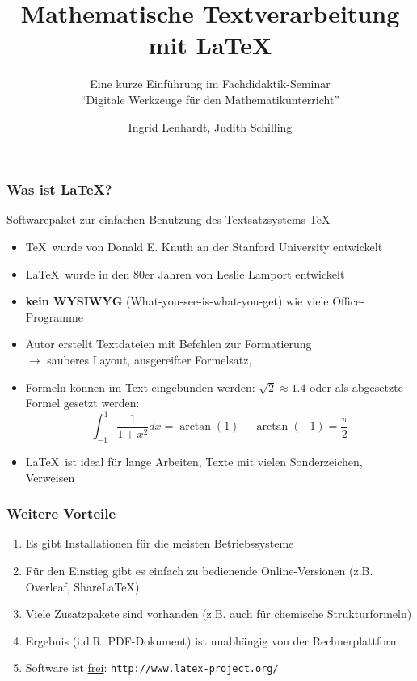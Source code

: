 \documentclass{beamer}
\title{Mathematische Textverarbeitung mit \LaTeX}
\subtitle{Eine kurze Einführung im Fachdidaktik-Seminar \\ ``Digitale Werkzeuge für den Mathematikunterricht''}
\author{Ingrid Lenhardt, Judith Schilling}
\begin{document}
 
\frame{\titlepage}

%
\begin{frame}
\frametitle{Was ist \LaTeX?}  %

Softwarepaket zur einfachen Benutzung des Textsatzsystems \TeX 
\begin{itemize} %
 \item \TeX \ wurde von Donald E. Knuth an der Stanford University entwickelt
 \item \LaTeX \ wurde in den 80er Jahren von Leslie Lamport entwickelt
 \item \textbf{kein WYSIWYG} %
       (What-you-see-is-what-you-get) wie viele Office-Programme
 \item Autor erstellt Textdateien mit Befehlen zur Formatierung \\ %
       $ \rightarrow $ %
       sauberes Layout, ausgereifter Formelsatz, 
 \item Formeln können im Text eingebunden werden: $\sqrt{2} \approx 1.4$ 
       oder als abgesetzte Formel gesetzt werden: 
       \[ 
          \int_{-1}^1 \frac{1}{1+x^2} dx = \arctan(1) -\arctan (-1) = \frac{\pi}{2}
       \] 
 \item \LaTeX \ ist ideal für lange Arbeiten, Texte mit vielen Sonderzeichen, Verweisen
\end{itemize}
\end{frame}

%
\begin{frame}
\frametitle{Weitere Vorteile}

\begin{enumerate} %
 \item Es gibt Installationen für die meisten Betriebssysteme
 \item Für den Einstieg gibt es einfach zu bedienende Online-Versionen (z.B. Overleaf, ShareLaTeX) 
 \item Viele Zusatzpakete sind vorhanden (z.B. auch für chemische Strukturformeln)
 \item Ergebnis (i.d.R. PDF-Dokument) ist unabhängig von der Rechnerplattform
 \item Software ist \underline{frei}: %
       \texttt{http://www.latex-project.org/} %
\end{enumerate}

\end{frame}
\end{document}
